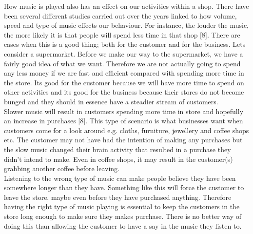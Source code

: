 How music is played also has an effect on our activities within a shop.  There have been several different studies carried out over the years linked to how volume, speed and type of music effects our behaviour.  For instance, the louder the music, the more likely it is that people will spend less time in that shop [8].  There are cases when this is a good thing; both for the customer and for the business.  Lets consider a supermarket.  Before we make our way to the supermarket, we have a fairly good idea of what we want.  Therefore we are not actually going to spend any less money if we are fast and efficient compared with spending more time in the store.  Its good for the customer because we will have more time to spend on other activities and its good for the business because their stores do not become bunged and they should in essence have a steadier stream of customers.  \\
Slower music will result in customers spending more time in store and hopefully an increase in purchases [8].  This type of scenario is what businesses want when customers come for a look around e.g. cloths, furniture, jewellery and coffee shops etc.  The customer may not have had the intention of making any purchases but the slow music changed their brain activity that resulted in a purchase they didn't intend to make.  Even in coffee shops, it may result in the customer(s) grabbing another coffee before leaving. \\
Listening to the wrong type of music can make people believe they have been somewhere longer than they have.  Something like this will force the customer to leave the store, maybe even before they have purchased anything.  Therefore having the right type of music playing is essential to keep the customers in the store long enough to make sure they makes purchase.  There is no better way of doing this than allowing the customer to have a say in the music they listen to. 

